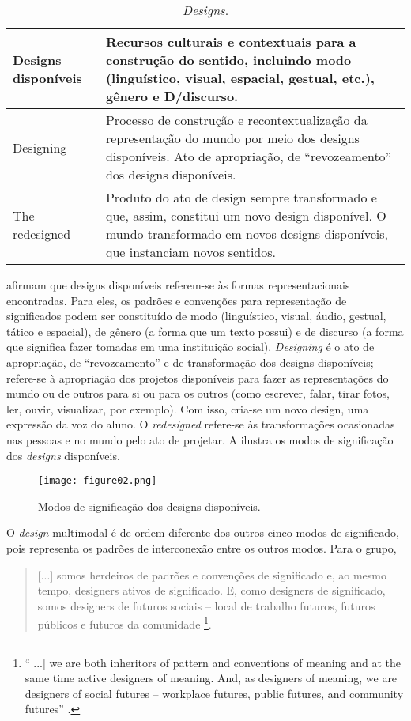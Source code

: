 \documentclass{textolivre}
\begin{document}
\begin{table}[htpb]
\caption{\emph{Designs}.}
\label{tbl02}
\begin{tabular}{lp{10cm}}
\toprule
Designs disponíveis & Recursos culturais e contextuais para a construção do sentido, incluindo modo (linguístico, visual, espacial, gestual, etc.), gênero e D/discurso. \\
\midrule
Designing & Processo de construção e recontextualização da representação do mundo por meio dos designs disponíveis. Ato de apropriação, de “revozeamento” dos designs disponíveis. \\
\midrule
The redesigned & Produto do ato de design sempre transformado e que, assim, constitui um novo design disponível. O mundo transformado em novos designs disponíveis, que instanciam novos sentidos. \\
\bottomrule
\end{tabular}
\end{table}


\textcite{cope2009} afirmam que designs disponíveis referem-se às formas
representacionais encontradas. Para eles, os padrões e convenções para
representação de significados podem ser constituído de modo (linguístico,
visual, áudio, gestual, tático e espacial), de gênero (a forma que um texto
possui) e de discurso (a forma que significa fazer tomadas em uma instituição
social). \emph{Designing} é o ato de apropriação, de “revozeamento” e de transformação
dos designs disponíveis; refere-se à apropriação dos projetos disponíveis para
fazer as representações do mundo ou de outros para si ou para os outros (como
escrever, falar, tirar fotos, ler, ouvir, visualizar, por exemplo). Com isso,
cria-se um novo design, uma expressão da voz do aluno. O \emph{redesigned} refere-se
às transformações ocasionadas nas pessoas e no mundo pelo ato de projetar. A
 ilustra os modos de significação dos \emph{designs} disponíveis.

\begin{figure}[htbp]
 \centering
 \texttt{[image: figure02.png]}
 \caption{Modos de significação dos designs disponíveis.}
 \label{fig02}
\end{figure}

O \emph{design} multimodal é de ordem diferente dos outros cinco modos de
significado, pois representa os padrões de interconexão entre os outros modos.
Para o grupo,
\begin{quote}
[...] somos herdeiros de padrões e convenções de significado e, ao mesmo tempo,
designers ativos de significado. E, como designers de significado, somos
designers de futuros sociais – local de trabalho futuros, futuros públicos e
futuros da comunidade \cite[p. 65, tradução nossa]{cazden1996}\footnote{
“[...] we are both inheritors of pattern and conventions of meaning and at the
same time active designers of meaning. And, as designers of meaning, we are
designers of social futures – workplace futures, public futures, and community
futures” \cite[p. 65]{cazden1996}.
}. 
\end{quote}
\end{document}
